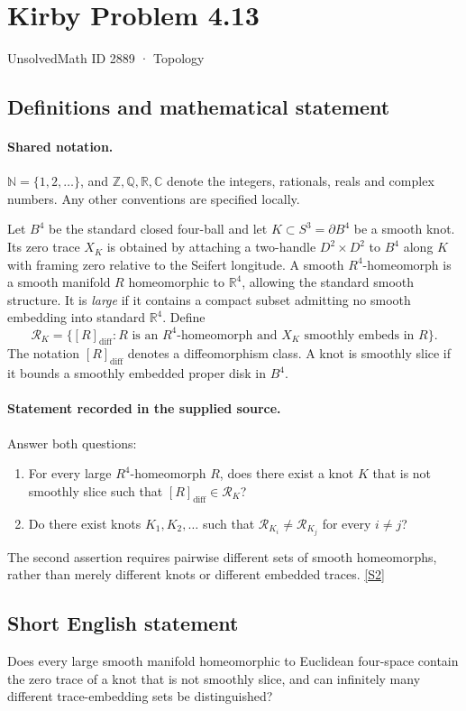 \documentclass[11pt]{article}
\newcommand{\sref}[2]{\hyperlink{source:#1:#2}{[S#2]}}
\begin{document}
\setcounter{section}{2888}
\section{Kirby Problem 4.13}\label{2889}
{\small\sffamily UnsolvedMath ID 2889 · Topology}
\subsection{Definitions and mathematical statement}

\paragraph{Shared notation.}$\mathbb N=\{1,2,\ldots\}$, and $\mathbb Z,\mathbb Q,\mathbb R,\mathbb C$ denote the integers, rationals, reals and complex numbers. Any other conventions are specified locally.


Let $B^4$ be the standard closed four-ball and let $K\subset S^3=\partial B^4$ be a smooth knot. Its zero trace $X_K$ is obtained by attaching a two-handle $D^2\times D^2$ to $B^4$ along $K$ with framing zero relative to the Seifert longitude. A smooth $R^4$-homeomorph is a smooth manifold $R$ homeomorphic to $\mathbb R^4$, allowing the standard smooth structure. It is \emph{large} if it contains a compact subset admitting no smooth embedding into standard $\mathbb R^4$. Define
\[
\mathcal R_K=\{[R]_{\mathrm{diff}}:R\text{ is an }R^4\text{-homeomorph and }X_K\text{ smoothly embeds in }R\}.
\]
The notation $[R]_{\mathrm{diff}}$ denotes a diffeomorphism class. A knot is smoothly slice if it bounds a smoothly embedded proper disk in $B^4$.
\paragraph{Statement recorded in the supplied source.}
Answer both questions:
\begin{enumerate}
\item[(a)] For every large $R^4$-homeomorph $R$, does there exist a knot $K$ that is not smoothly slice such that $[R]_{\mathrm{diff}}\in\mathcal R_K$?
\item[(b)] Do there exist knots $K_1,K_2,\ldots$ such that $\mathcal R_{K_i}\ne\mathcal R_{K_j}$ for every $i\ne j$?
\end{enumerate}
The second assertion requires pairwise different sets of smooth homeomorphs, rather than merely different knots or different embedded traces. \sref{2889}{2}
\subsection{Short English statement}
Does every large smooth manifold homeomorphic to Euclidean four-space contain the zero trace of a knot that is not smoothly slice, and can infinitely many different trace-embedding sets be distinguished?
\end{document}
